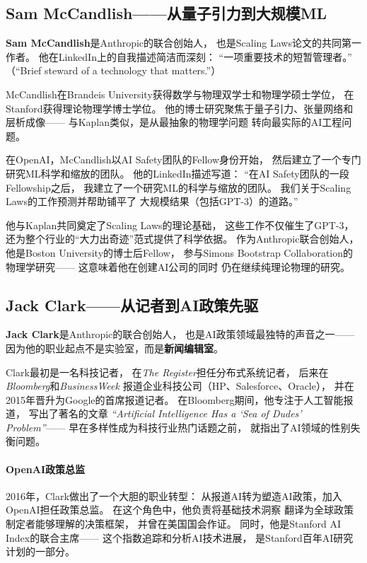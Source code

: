 \subsection{Sam McCandlish——从量子引力到大规模ML}
\label{subsec:mccandlish}

\textbf{Sam McCandlish}是Anthropic的联合创始人，
也是Scaling Laws论文的共同第一作者。
他在LinkedIn上的自我描述简洁而深刻：
``一项重要技术的短暂管理者。''
（``Brief steward of a technology that matters.''）

McCandlish在Brandeis University获得数学与物理双学士和物理学硕士学位，
在Stanford获得理论物理学博士学位。
他的博士研究聚焦于量子引力、张量网络和层析成像——
与Kaplan类似，是从最抽象的物理学问题
转向最实际的AI工程问题。

在OpenAI，McCandlish以AI Safety团队的Fellow身份开始，
然后建立了一个专门研究ML科学和缩放的团队。
他的LinkedIn描述写道：
``在AI Safety团队的一段Fellowship之后，
我建立了一个研究ML的科学与缩放的团队。
我们关于Scaling Laws的工作预测并帮助铺平了
大规模结果（包括GPT-3）的道路。''

他与Kaplan共同奠定了Scaling Laws的理论基础，
这些工作不仅催生了GPT-3，
还为整个行业的``大力出奇迹''范式提供了科学依据。
作为Anthropic联合创始人，他是Boston University的博士后Fellow，
参与Simons Bootstrap Collaboration的物理学研究——
这意味着他在创建AI公司的同时
仍在继续纯理论物理的研究。

\subsection{Jack Clark——从记者到AI政策先驱}
\label{subsec:clark}

\textbf{Jack Clark}是Anthropic的联合创始人，
也是AI政策领域最独特的声音之一——
因为他的职业起点不是实验室，而是\textbf{新闻编辑室}。

Clark最初是一名科技记者，
在\textit{The Register}担任分布式系统记者，
后来在\textit{Bloomberg}和\textit{BusinessWeek}
报道企业科技公司（HP、Salesforce、Oracle），
并在2015年晋升为Google的首席报道记者。
在Bloomberg期间，他专注于人工智能报道，
写出了著名的文章
\textit{``Artificial Intelligence Has a `Sea of Dudes' Problem''}——
早在多样性成为科技行业热门话题之前，
就指出了AI领域的性别失衡问题。

\paragraph{OpenAI政策总监}
2016年，Clark做出了一个大胆的职业转型：
从报道AI转为塑造AI政策，加入OpenAI担任政策总监。
在这个角色中，他负责将基础技术洞察
翻译为全球政策制定者能够理解的决策框架，
并曾在美国国会作证。
同时，他是Stanford AI Index的联合主席——
这个指数追踪和分析AI技术进展，
是Stanford百年AI研究计划的一部分。

